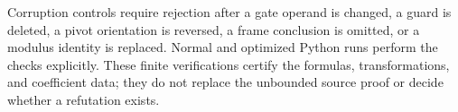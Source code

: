 Corruption controls require rejection after a gate operand is changed,
a guard is deleted, a pivot orientation is reversed, a frame conclusion
is omitted, or a modulus identity is replaced.  Normal and optimized
Python runs perform the checks explicitly.  These finite verifications
certify the formulas, transformations, and coefficient data; they do not
replace the unbounded source proof or decide whether a refutation exists.
